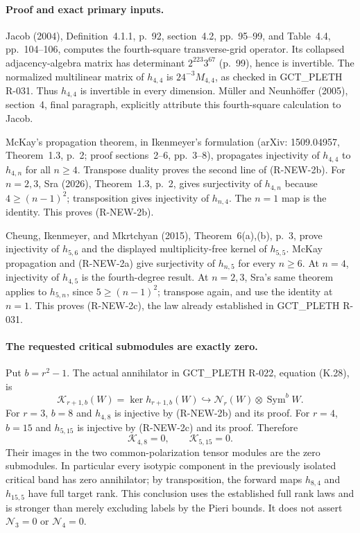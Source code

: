 \paragraph{Proof and exact primary inputs.}
Jacob (2004), Definition~4.1.1, p.~92, section~4.2, pp.~95--99,
and Table~4.4, pp.~104--106, computes the fourth-square transverse-grid
operator. Its collapsed adjacency-algebra matrix has determinant
$2^{223}3^{67}$ (p.~99), hence is invertible. The normalized
multilinear matrix of $h_{4,4}$ is $24^{-3}M_{4,4}$, as checked in
GCT\_PLETH R-031. Thus $h_{4,4}$ is invertible in every dimension.
M\"uller and Neunh\"offer (2005), section~4, final paragraph, explicitly
attribute this fourth-square calculation to Jacob.

McKay's propagation theorem, in Ikenmeyer's formulation (arXiv:
1509.04957, Theorem~1.3, p.~2; proof sections~2--6, pp.~3--8),
propagates injectivity of $h_{4,4}$ to $h_{4,n}$ for all $n\ge4$.
Transpose duality proves the second line of (R-NEW-2b).
For $n=2,3$, Sra (2026), Theorem~1.3, p.~2, gives surjectivity of
$h_{4,n}$ because $4\ge(n-1)^2$; transposition gives injectivity
of $h_{n,4}$. The $n=1$ map is the identity. This proves
(R-NEW-2b).

Cheung, Ikenmeyer, and Mkrtchyan (2015), Theorem~6(a),(b), p.~3,
prove injectivity of $h_{5,6}$ and the displayed multiplicity-free
kernel of $h_{5,5}$. McKay propagation and (R-NEW-2a) give
surjectivity of $h_{n,5}$ for every $n\ge6$. At $n=4$, injectivity
of $h_{4,5}$ is the fourth-degree result. At $n=2,3$, Sra's
same theorem applies to $h_{5,n}$, since $5\ge(n-1)^2$;
transpose again, and use the identity at $n=1$. This proves
(R-NEW-2c), the law already established in GCT\_PLETH R-031.

\paragraph{The requested critical submodules are exactly zero.}
Put $b=r^2-1$. The actual annihilator in GCT\_PLETH R-022,
equation (K.28), is
\[
 \mathcal K_{r+1,b}(W)=\ker h_{r+1,b}(W)
       \hookrightarrow\mathcal N_r(W)\otimes\operatorname{Sym}^{b}W.
\]
For $r=3$, $b=8$ and $h_{4,8}$ is injective by (R-NEW-2b)
and its proof. For $r=4$, $b=15$ and $h_{5,15}$ is injective
by (R-NEW-2c) and its proof. Therefore
\[
 \boxed{\mathcal K_{4,8}=0,\qquad\mathcal K_{5,15}=0.}
 \tag{R-NEW-2d}
\]
Their images in the two common-polarization tensor modules are the
zero submodules. In particular every isotypic component in the
previously isolated critical band has zero annihilator; by transposition,
the forward maps $h_{8,4}$ and $h_{15,5}$ have full target rank.
This conclusion uses the established full rank laws and is
stronger than merely excluding labels by the Pieri bounds. It does
not assert $\mathcal N_3=0$ or $\mathcal N_4=0$.

